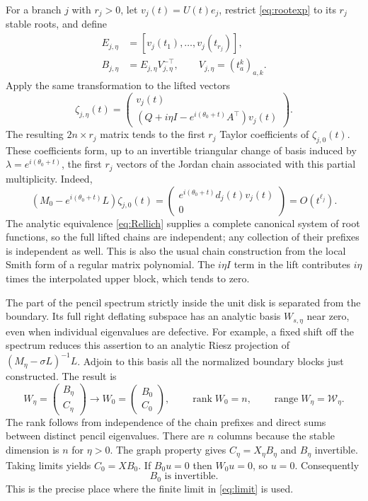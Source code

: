 \documentclass[11pt]{article}
\newcommand{\C}{\mathbb C}
\newcommand{\rank}{\operatorname{rank}}
\begin{document}
For a branch $j$ with $r_j>0$, let $v_j(t)=U(t)e_j$, restrict \eqref{eq:rootexp} to its
$r_j$ stable roots, and define
\begin{align*}
E_{j,\eta}&=[v_j(t_1),\ldots,v_j(t_{r_j})],\\
B_{j,\eta}&=E_{j,\eta}V_{j,\eta}^{-\top},\qquad
V_{j,\eta}=(t_a^k)_{a,k}.
\end{align*}
Apply the same transformation to the lifted vectors
\[
\zeta_{j,\eta}(t)=
\begin{pmatrix}v_j(t)\\(Q+i\eta I-e^{i(\theta_0+t)}A^\top)v_j(t)\end{pmatrix}.
\]
The resulting $2n\times r_j$ matrix tends to the first $r_j$ Taylor coefficients of
$\zeta_{j,0}(t)$. These coefficients form, up to an invertible triangular change of
basis induced by $\lambda=e^{i(\theta_0+t)}$, the first $r_j$ vectors of the Jordan chain
associated with this partial multiplicity. Indeed,
\[
(M_0-e^{i(\theta_0+t)}L)\zeta_{j,0}(t)
=\begin{pmatrix}e^{i(\theta_0+t)}d_j(t)v_j(t)\\0\end{pmatrix}
=O(t^{\ell_j}).
\]
The analytic equivalence \eqref{eq:Rellich} supplies a complete canonical system of root
functions, so the full lifted chains are independent; any collection of their prefixes
is independent as well. This is also the usual chain construction from the local Smith
form of a regular matrix polynomial. The $i\eta I$ term in the lift contributes $i\eta$
times the interpolated upper block, which tends to zero.

The part of the pencil spectrum strictly inside the unit disk is separated from the
boundary. Its full right deflating subspace has an analytic basis $W_{s,\eta}$ near zero,
even when individual eigenvalues are defective. For example, a fixed shift off the spectrum
reduces this assertion to an analytic Riesz projection of $(M_\eta-\sigma L)^{-1}L$.
Adjoin to this basis all the normalized boundary blocks just constructed. The result is
\begin{equation}\label{eq:W}
W_\eta=\begin{pmatrix}B_\eta\\C_\eta\end{pmatrix}\longrightarrow
W_0=\begin{pmatrix}B_0\\C_0\end{pmatrix},
\qquad \rank W_0=n,\qquad \operatorname{range}W_\eta=\mathcal W_\eta.
\end{equation}
The rank follows from independence of the chain prefixes and direct sums between distinct
pencil eigenvalues. There are $n$ columns because the stable dimension is $n$ for $\eta>0$.
The graph property gives $C_\eta=X_\eta B_\eta$ and $B_\eta$ invertible. Taking limits yields
$C_0=XB_0$. If $B_0u=0$ then $W_0u=0$, so $u=0$. Consequently
\begin{equation}\label{eq:Binv}
B_0\text{ is invertible}.
\end{equation}
This is the precise place where the finite limit in \eqref{eq:limit} is used.
\end{document}
